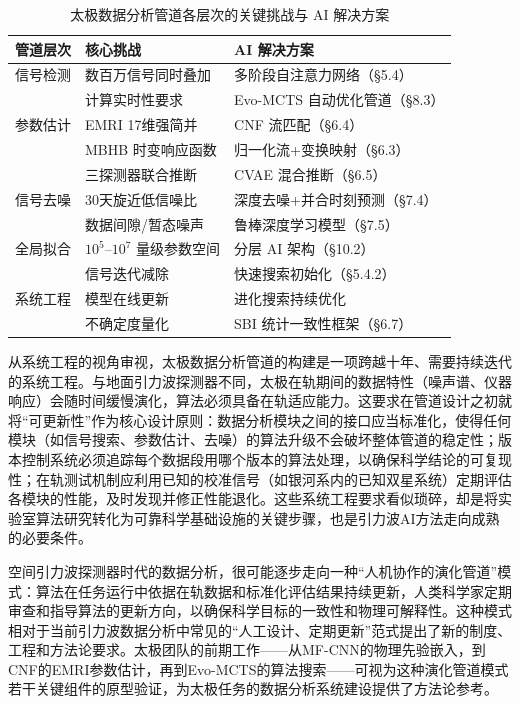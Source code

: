 \begin{table}[htbp]
\centering
\caption{太极数据分析管道各层次的关键挑战与 AI 解决方案}
\label{tab:taiji_pipeline}
\small
\begin{tabular}{lll}
\hline
\textbf{管道层次} & \textbf{核心挑战} & \textbf{AI 解决方案} \\
\hline
信号检测 & 数百万信号同时叠加 & 多阶段自注意力网络（§5.4）\\
         & 计算实时性要求 & Evo-MCTS 自动优化管道（§8.3）\\
\hline
参数估计 & EMRI 17维强简并 & CNF 流匹配（§6.4）\\
         & MBHB 时变响应函数 & 归一化流+变换映射（§6.3）\\
         & 三探测器联合推断 & CVAE 混合推断（§6.5）\\
\hline
信号去噪 & 30天旋近低信噪比 & 深度去噪+并合时刻预测（§7.4）\\
         & 数据间隙/暂态噪声 & 鲁棒深度学习模型（§7.5）\\
\hline
全局拟合 & $10^5$--$10^7$ 量级参数空间 & 分层 AI 架构（§10.2）\\
         & 信号迭代减除 & 快速搜索初始化（§5.4.2）\\
\hline
系统工程 & 模型在线更新 & 进化搜索持续优化 \\
         & 不确定度量化 & SBI 统计一致性框架（§6.7）\\
\hline
\end{tabular}
\end{table}

从系统工程的视角审视，太极数据分析管道的构建是一项跨越十年、需要持续迭代的系统工程。与地面引力波探测器不同，太极在轨期间的数据特性（噪声谱、仪器响应）会随时间缓慢演化，算法必须具备在轨适应能力。这要求在管道设计之初就将“可更新性”作为核心设计原则：数据分析模块之间的接口应当标准化，使得任何模块（如信号搜索、参数估计、去噪）的算法升级不会破坏整体管道的稳定性；版本控制系统必须追踪每个数据段用哪个版本的算法处理，以确保科学结论的可复现性；在轨测试机制应利用已知的校准信号（如银河系内的已知双星系统）定期评估各模块的性能，及时发现并修正性能退化。这些系统工程要求看似琐碎，却是将实验室算法研究转化为可靠科学基础设施的关键步骤，也是引力波AI方法走向成熟的必要条件。

空间引力波探测器时代的数据分析，很可能逐步走向一种“人机协作的演化管道”模式：算法在任务运行中依据在轨数据和标准化评估结果持续更新，人类科学家定期审查和指导算法的更新方向，以确保科学目标的一致性和物理可解释性。这种模式相对于当前引力波数据分析中常见的“人工设计、定期更新”范式提出了新的制度、工程和方法论要求。太极团队的前期工作——从MF-CNN的物理先验嵌入，到CNF的EMRI参数估计，再到Evo-MCTS的算法搜索——可视为这种演化管道模式若干关键组件的原型验证，为太极任务的数据分析系统建设提供了方法论参考。

